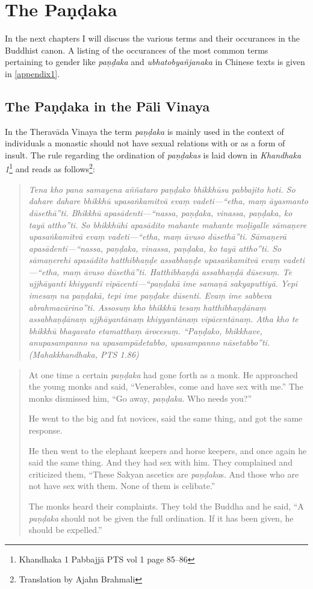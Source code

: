 \section{The Paṇḍaka}

In the next chapters I will discuss the various terms and their occurances in the Buddhist canon. A listing of the occurances of the most common terms pertaining to gender like {\em paṇḍaka} and {\em ubhatob­yañ­janaka} in Chinese texts is given in \ref{appendix1}. 

\subsection{The Paṇḍaka in the Pāli Vinaya}
In the Theravāda Vinaya the term {\em paṇḍaka} is mainly used in the context of individuals a monastic should not have sexual relations with or as a form of insult. The rule regarding the ordination of {\em paṇḍakas} is laid down in {\em Khandhaka 1}\footnote{Khandhaka 1 Pabbajjā PTS vol 1 page 85–86} and reads as follows\footnote{Translation by Ajahn Brahmali}:

\begin{quote}
{\em Tena kho pana samayena aññataro paṇḍako bhikkhūsu pabbajito hoti. So dahare dahare bhikkhū upasaṅkamitvā evaṃ vadeti—“etha, maṃ āyasmanto dūsethā”ti. Bhikkhū apasādenti—“nassa, paṇḍaka, vinassa, paṇḍaka, ko tayā attho”ti. So bhikkhūhi apasādito mahante mahante moḷigalle sāmaṇere upasaṅkamitvā evaṃ vadeti—“etha, maṃ āvuso dūsethā”ti. Sāmaṇerā apasādenti—“nassa, paṇḍaka, vinassa, paṇḍaka, ko tayā attho”ti. So sāmaṇerehi apasādito hatthibhaṇḍe assabhaṇḍe upasaṅkamitvā evaṃ vadeti—“etha, maṃ āvuso dūsethā”ti. Hatthibhaṇḍā assabhaṇḍā dūsesuṃ. Te ujjhāyanti khiyyanti vipācenti—“paṇḍakā ime samaṇā sakyaputtiyā. Yepi imesaṃ na paṇḍakā, tepi ime paṇḍake dūsenti. Evaṃ ime sabbeva abrahmacārino”ti. Assosuṃ kho bhikkhū tesaṃ hatthibhaṇḍānaṃ assabhaṇḍānaṃ ujjhāyantānaṃ khiyyantānaṃ vipācentānaṃ. Atha kho te bhikkhū bhagavato etamatthaṃ ārocesuṃ. “Paṇḍako, bhikkhave, anupasampanno na upasampādetabbo, upasampanno nāsetabbo”ti. (Mahakkhandhaka, PTS 1.86)}
\end{quote}
\medskip

\begin{quote}
At one time a certain {\em paṇḍaka} had gone forth as a monk. He approached the young monks and said, “Venerables, come and have sex with me.” The monks dismissed him, “Go away, {\em paṇḍaka}. Who needs you?”

He went to the big and fat novices, said the same thing, and got the same response.

He then went to the elephant keepers and horse keepers, and once again he said the same thing. And they had sex with him. They complained and criticized them, “These Sakyan ascetics are {\em paṇḍaka}s. And those who are not have sex with them. None of them is celibate.”

The monks heard their complaints. They told the Buddha and he said, “A {\em paṇḍaka} should not be given the full ordination. If it has been given, he should be expelled.”
\end{quote}


